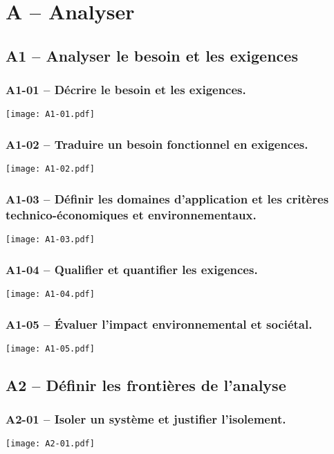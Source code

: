 \section{A -- Analyser}  
\subsection{A1 -- Analyser le besoin et les exigences}  
\subsubsection*{A1-01 -- Décrire le besoin et les exigences.}  
\begin{center} 
\texttt{[image: A1-01.pdf]} 
\end{center} 
\subsubsection*{A1-02 -- Traduire un besoin fonctionnel en exigences.}  
\begin{center} 
\texttt{[image: A1-02.pdf]} 
\end{center} 
\subsubsection*{A1-03 -- Définir les domaines d’application et les critères technico-économiques et environnementaux.}  
\begin{center} 
\texttt{[image: A1-03.pdf]} 
\end{center} 
\subsubsection*{A1-04 -- Qualifier et quantifier les exigences.}  
\begin{center} 
\texttt{[image: A1-04.pdf]} 
\end{center} 
\subsubsection*{A1-05 -- Évaluer l’impact environnemental et sociétal.}  
\begin{center} 
\texttt{[image: A1-05.pdf]} 
\end{center} 
\subsection{A2 -- Définir les frontières de l'analyse}  
\subsubsection*{A2-01 -- Isoler un système et justifier l’isolement.}  
\begin{center} 
\texttt{[image: A2-01.pdf]} 
\end{center} 
